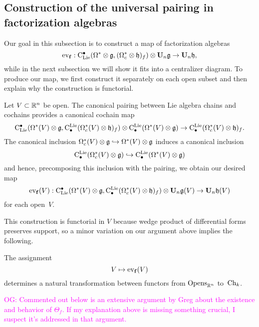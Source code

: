 \documentclass[11pt]{amsart}
\numberwithin{equation}{section}
\def\owen{\textcolor{magenta}{OG: }\textcolor{magenta}}
\begin{document}
\subsection{Construction of the universal pairing in factorization algebras}
\label{SS:constuctionthetaf}

Our goal in this subsection is to construct a map of factorization algebras
\[
{\rm ev}_{{\bf f}}: {\rm C}_{\rm Lie}^\bullet(\Omega^* \otimes \mathfrak g, (\Omega^*_c \otimes \mathfrak h)_f) \otimes \mathbf U_n \mathfrak g \to \mathbf U_n \mathfrak h,
\]
while in the next subsection we will show it fits into a centralizer diagram.
To produce our map, we first construct it separately on each open subset and then explain why the construction is functorial. 

Let $V \subset \mathbb R^n$ be open.
The canonical pairing between Lie algebra chains and cochains provides a canonical cochain map
\[
{\rm C}_{\rm Lie}^\bullet(\Omega^*(V) \otimes \mathfrak g, {\rm C}^{\rm Lie}_\bullet(\Omega^*_c(V) \otimes \mathfrak h)_f) \otimes {\rm C}^{\rm Lie}_\bullet(\Omega^*(V) \otimes \mathfrak g) \to {\rm C}^{\rm Lie}_\bullet(\Omega^*_c(V) \otimes \mathfrak h)_f.
\]
The canonical inclusion $\Omega^*_c(V) \otimes \mathfrak g \hookrightarrow \Omega^*(V) \otimes \mathfrak g$ induces a canonical inclusion 
\[
{\rm C}^{\rm Lie}_\bullet(\Omega^*_c(V) \otimes \mathfrak g) \hookrightarrow {\rm C}^{\rm Lie}_\bullet(\Omega^*(V) \otimes \mathfrak g)
\]
and hence, precomposing this inclusion with the pairing, we obtain our desired map
\[
{\rm ev}_{{\bf f}}(V): {\rm C}_{\rm Lie}^\bullet(\Omega^*(V) \otimes \mathfrak g, {\rm C}^{\rm Lie}_\bullet(\Omega^*_c(V) \otimes \mathfrak h)_f) \otimes \mathbf U_n \mathfrak g(V) \to \mathbf U_n \mathfrak h(V)
\]
for each open~$V$.

This construction is functorial in $V$ because wedge product of differential forms preserves support,
so a minor variation on our argument above implies the following.

\begin{lmm}
The assignment
\[
V \mapsto {\rm ev}_{{\bf f}}(V)
\]
determines a natural transformation between functors from ${\rm Opens}_{\mathbb R^n}$ to~${\rm Ch}_k$.
\end{lmm}

\owen{Commented out below is an extensive argument by Greg about the existence and behavior of $\Theta_f$. If my explanation above is missing something crucial, I suspect it's addressed in that argument.}
\end{document}
